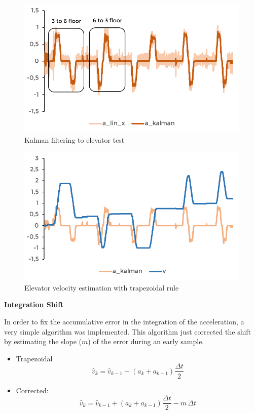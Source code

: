 \begin{figure}[h!]
	\includegraphics[width=1.0\linewidth]{figs/04/acceleration/1}
	\caption{Kalman filtering to elevator test}
\end{figure}
\begin{figure}[h!]
	\includegraphics[width=1.0\linewidth]{figs/04/acceleration/2}
	\caption{Elevator velocity estimation with trapezoidal rule}
\end{figure}

\textbf{Integration Shift}

In order to fix the accumulative error in the integration of the acceleration, a very simple algorithm was implemented. This algorithm just corrected the shift by estimating the slope ($m$) of the error during an early sample. 

\begin{itemize}
\begin{itemize}
	\item Trapezoidal
	\[\hat{v}_{k}=\hat{v}_{k-1}+(a_{k}+a_{k-1})\frac{\Delta t}{2}\]

	\item Corrected:
	\[\hat{v}_{k}=\hat{v}_{k-1}+(a_{k}+a_{k-1})\frac{\Delta t}{2}-m\,\Delta t\]
\end{itemize}
\end{itemize}
\newpage

